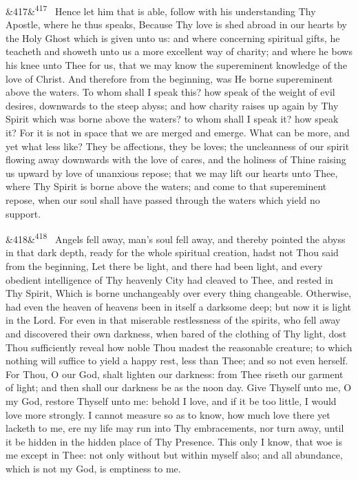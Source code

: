 \documentclass[12pt]{article}
\newcommand{\para}[1][]{\par\noindent\ifx&#1&\else\textsuperscript{\footnotesize #1}~\fi}
\begin{document}
\para[417] Hence let him that is able, follow with his understanding Thy Apostle, where he thus speaks, Because Thy love is shed abroad in our hearts by the Holy Ghost which is given unto us: and where concerning spiritual gifts, he teacheth and showeth unto us a more excellent way of charity; and where he bows his knee unto Thee for us, that we may know the supereminent knowledge of the love of Christ. And therefore from the beginning, was He borne supereminent above the waters. To whom shall I speak this? how speak of the weight of evil desires, downwards to the steep abyss; and how charity raises up again by Thy Spirit which was borne above the waters? to whom shall I speak it? how speak it? For it is not in space that we are merged and emerge. What can be more, and yet what less like? They be affections, they be loves; the uncleanness of our spirit flowing away downwards with the love of cares, and the holiness of Thine raising us upward by love of unanxious repose; that we may lift our hearts unto Thee, where Thy Spirit is borne above the waters; and come to that supereminent repose, when our soul shall have passed through the waters which yield no support.

\para[418] Angels fell away, man's soul fell away, and thereby pointed the abyss in that dark depth, ready for the whole spiritual creation, hadst not Thou said from the beginning, Let there be light, and there had been light, and every obedient intelligence of Thy heavenly City had cleaved to Thee, and rested in Thy Spirit, Which is borne unchangeably over every thing changeable. Otherwise, had even the heaven of heavens been in itself a darksome deep; but now it is light in the Lord. For even in that miserable restlessness of the spirits, who fell away and discovered their own darkness, when bared of the clothing of Thy light, dost Thou sufficiently reveal how noble Thou madest the reasonable creature; to which nothing will suffice to yield a happy rest, less than Thee; and so not even herself. For Thou, O our God, shalt lighten our darkness: from Thee riseth our garment of light; and then shall our darkness be as the noon day. Give Thyself unto me, O my God, restore Thyself unto me: behold I love, and if it be too little, I would love more strongly. I cannot measure so as to know, how much love there yet lacketh to me, ere my life may run into Thy embracements, nor turn away, until it be hidden in the hidden place of Thy Presence. This only I know, that woe is me except in Thee: not only without but within myself also; and all abundance, which is not my God, is emptiness to me.
\end{document}
